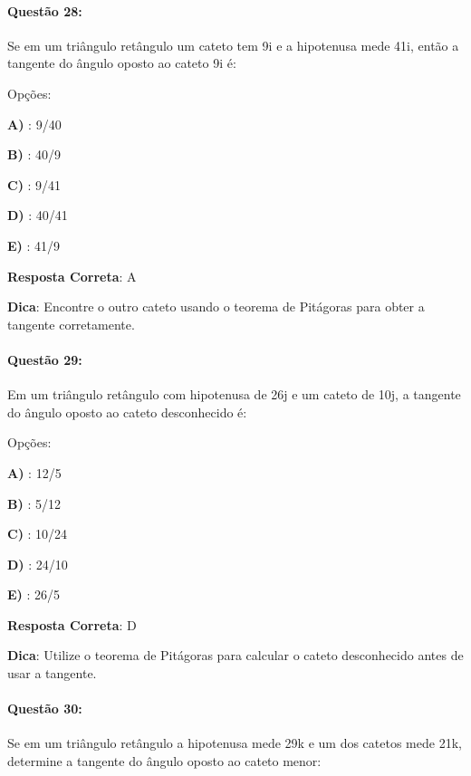 \documentclass{article}
\begin{document}
\paragraph{Questão 28:}
{Se em um triângulo retângulo um cateto tem 9i e a hipotenusa mede 41i, então a tangente do ângulo oposto ao cateto 9i é:}

\vspace{\baselineskip}Opções:

\vspace{\baselineskip}\textbf{A) }: 9/40 

\textbf{B) }: 40/9 

\textbf{C) }: 9/41 

\textbf{D) }: 40/41 

\textbf{E) }: 41/9 

\vspace{\baselineskip}\textbf{Resposta Correta}: A

\vspace{\baselineskip}\textbf{Dica}: Encontre o outro cateto usando o teorema de Pitágoras para obter a tangente corretamente.

\paragraph{Questão 29:}
{Em um triângulo retângulo com hipotenusa de 26j e um cateto de 10j, a tangente do ângulo oposto ao cateto desconhecido é:}

\vspace{\baselineskip}Opções:

\vspace{\baselineskip}\textbf{A) }: 12/5 

\textbf{B) }: 5/12 

\textbf{C) }: 10/24 

\textbf{D) }: 24/10 

\textbf{E) }: 26/5 

\vspace{\baselineskip}\textbf{Resposta Correta}: D

\vspace{\baselineskip}\textbf{Dica}: Utilize o teorema de Pitágoras para calcular o cateto desconhecido antes de usar a tangente.

\paragraph{Questão 30:}
{Se em um triângulo retângulo a hipotenusa mede 29k e um dos catetos mede 21k, determine a tangente do ângulo oposto ao cateto menor:}
\end{document}
